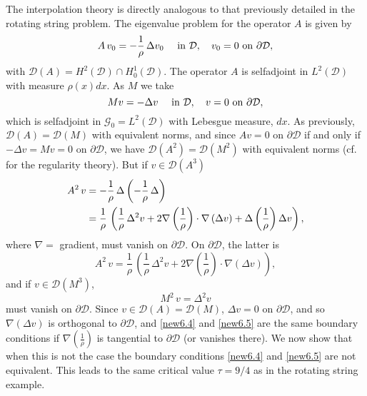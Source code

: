 \documentclass[final]{siamltex}
\numberwithin{equation}{section}
\begin{document}
The interpolation theory is directly analogous to that previously detailed in the rotating string problem. The eigenvalue problem for the operator $A$ is given by
\begin{equation} \notag
A \, v_0 = -\frac{1}{\rho} \, \Delta v_0 \quad \text{ in } \mathcal{D}, \quad v_0=0
\text{ on } \partial \mathcal{D},\end{equation}
with $\mathcal{D}(A) = H^2(\mathcal{D}) \cap H_0^1(\mathcal{D})$. The operator $A$ is selfadjoint in $L^2(\mathcal{D})$ with measure $\rho(x) dx$. As $M$ we take
\begin{equation} \notag
M v = - \Delta v
\quad \text{ in } \mathcal{D}, \quad v=0
\text{ on } \partial \mathcal{D},\end{equation}
which is selfadjoint in $\mathcal{G}_0=L^2(\mathcal{D})$ with Lebesgue measure, $dx$. As previously, $\mathcal{D}(A)=\mathcal{D}(M)$ with equivalent norms, and since $A v=0$ on $\partial \mathcal{D}$ if and only if $-\Delta v= M v=0$ on $\partial \mathcal{D}$, we have $\mathcal{D}(A^2)=\mathcal{D}(M^2)$ with equivalent norms (cf. \cite{Lions-Magenes} for the regularity theory). But if $v \in \mathcal{D}(A^3)$
\begin{align}
A^2 \, v &= -\frac{1}{\rho} \, \Delta \left(-\frac{1}{\rho} \, \Delta \right) \notag \\
&= \frac{1}{\rho} \, \left(\frac{1}{\rho} \, \Delta^2 v + 2 \nabla \left(\frac{1}{\rho}\right) \cdot \nabla \left(\Delta v\right) + \Delta \left(\frac{1}{\rho}\right) \Delta v\right), \notag
\end{align}
where $\nabla=$ gradient, must vanish on $\partial \mathcal{D}$. On $\partial \mathcal{D}$, the latter is
\begin{equation} \label{new6.4}
A^2 \, v = \frac{1}{\rho} \, \left(\frac{1}{\rho} \, \Delta^2 v + 2 \nabla \left(\frac{1}{\rho}\right) \cdot \nabla \left(\Delta v\right) \right),
\end{equation}
and if $v \in \mathcal{D}(M^3)$,
\begin{equation} \label{new6.5}
M^2 \, v =\Delta^2 v
\end{equation}
must vanish on $\partial \mathcal{D}$. Since $v \in \mathcal{D}(A)=\mathcal{D}(M)$, $\Delta v= 0$ on $\partial \mathcal{D}$, and so $\nabla \left(\Delta v\right)$ is orthogonal to $\partial \mathcal{D}$, and \eqref{new6.4} and \eqref{new6.5} are the same boundary conditions if $\nabla \left(\frac{1}{\rho}\right)$ is tangential to $\partial \mathcal{D}$ (or vanishes there). We now show that when this is not the case the boundary conditions \eqref{new6.4} and \eqref{new6.5} are not equivalent. This leads to the same critical value $\tau=9/4$ as in the rotating string example.
\end{document}
